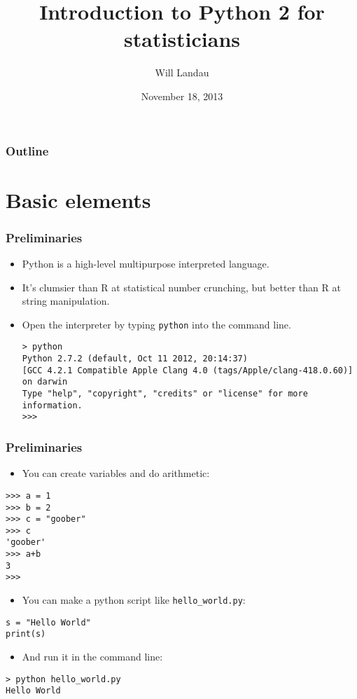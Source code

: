 \documentclass[handout]{beamer}
\title{Introduction to Python 2 for statisticians}
\author{Will Landau}
\date{November 18, 2013}
\institute{Iowa State University}
\numberwithin{equation}{section}
\begin{document}
\begin{frame}
\titlepage
 \end{frame}
 
 \begin{frame}
\frametitle{Outline}
\tableofcontents
\end{frame}
 

\section{Basic elements}

\begin{frame}[fragile]
\frametitle{Preliminaries}
\begin{itemize}
\item Python is a high-level multipurpose interpreted language. 
\pause \item It's clumsier than R at statistical number crunching, but better than R at string manipulation.
\pause \item Open the interpreter by typing {\tt python} into the command line.
\begin{lstlisting}[name=ex]
> python
Python 2.7.2 (default, Oct 11 2012, 20:14:37) 
[GCC 4.2.1 Compatible Apple Clang 4.0 (tags/Apple/clang-418.0.60)] on darwin
Type "help", "copyright", "credits" or "license" for more information.
>>> 
\end{lstlisting}
\end{itemize}
\end{frame}

\begin{frame}[fragile]
\frametitle{Preliminaries}
\begin{itemize}
\item You can create variables and do arithmetic:
\end{itemize}
\begin{lstlisting}[name=ex]
>>> a = 1
>>> b = 2
>>> c = "goober"
>>> c
'goober'
>>> a+b
3
>>> 
\end{lstlisting}
\begin{itemize}
\pause \item You can make a python script like {\tt hello\_world.py}:
\end{itemize}
\begin{lstlisting}[name=ex]
s = "Hello World"
print(s)
\end{lstlisting}
\begin{itemize}
\pause \item And run it in the command line:
\end{itemize}
\begin{lstlisting}[name=ex]
> python hello_world.py
Hello World
\end{lstlisting}
\end{frame}
\end{document}
